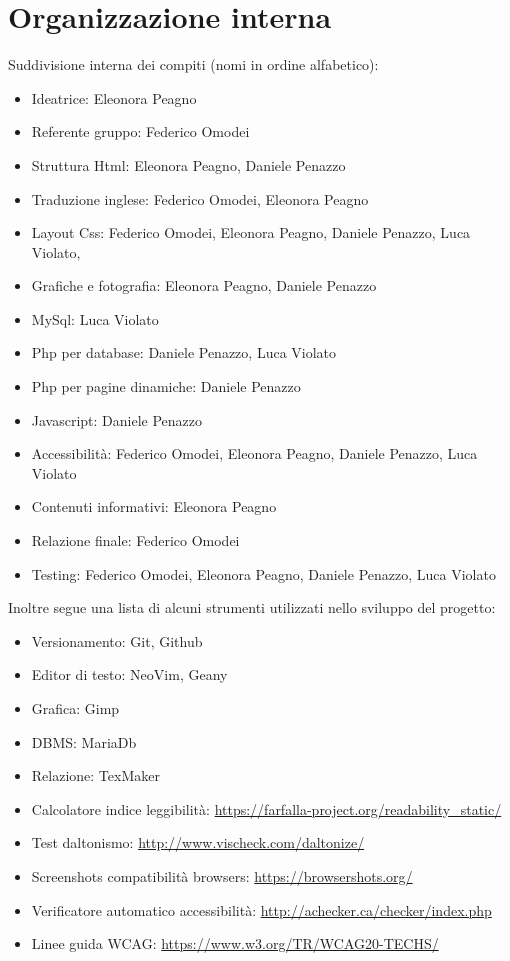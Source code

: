 \section{Organizzazione interna}
Suddivisione interna dei compiti (nomi in ordine alfabetico): 
\begin{itemize}
\item Ideatrice: Eleonora Peagno
\item Referente gruppo: Federico Omodei
\item Struttura Html: Eleonora Peagno, Daniele Penazzo
\item Traduzione inglese: Federico Omodei, Eleonora Peagno
\item Layout Css: Federico Omodei, Eleonora Peagno, Daniele Penazzo, Luca Violato, 
\item Grafiche e fotografia: Eleonora Peagno, Daniele Penazzo
\item MySql: Luca Violato
\item Php per database: Daniele Penazzo, Luca Violato
\item Php per pagine dinamiche: Daniele Penazzo
\item Javascript: Daniele Penazzo
\item Accessibilità: Federico Omodei, Eleonora Peagno, Daniele Penazzo, Luca Violato
\item Contenuti informativi: Eleonora Peagno
\item Relazione finale: Federico Omodei
\item Testing: Federico Omodei, Eleonora Peagno, Daniele Penazzo, Luca Violato
\end{itemize}

\pagebreak

Inoltre segue una lista di alcuni strumenti utilizzati nello sviluppo del progetto:
\begin{itemize}
\item Versionamento: Git, Github
\item Editor di testo: NeoVim, Geany
\item Grafica: Gimp
\item DBMS: MariaDb
\item Relazione: TexMaker
\item Calcolatore indice leggibilità: \url{https://farfalla-project.org/readability_static/}
\item Test daltonismo: \url{http://www.vischeck.com/daltonize/}
\item Screenshots compatibilità browsers: \url{https://browsershots.org/}
\item Verificatore automatico accessibilità: \url{http://achecker.ca/checker/index.php}
\item Linee guida WCAG: \url{https://www.w3.org/TR/WCAG20-TECHS/}
\end{itemize}